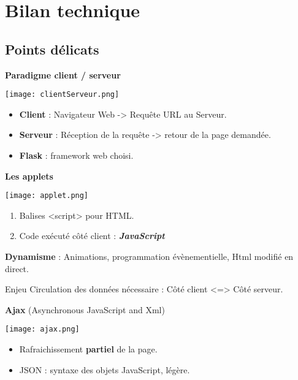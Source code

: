 	\section{Bilan technique}
		\subsection*{Points délicats}
		\begin{frame}
			\textbf{Paradigme client / serveur}\\
				\begin{center}\texttt{[image: clientServeur.png]}\end{center}
				\begin{itemize}
				\item \textbf{Client} : Navigateur Web -> Requête URL au Serveur.
				\item \textbf{Serveur} : Réception de la requête -> retour de la page demandée.
				\item \textbf{Flask} : framework web choisi.
				\end{itemize}
		\end{frame}
		
		\begin{frame}
			\textbf{Les applets}\\
				\begin{center}\texttt{[image: applet.png]}\end{center}
				\begin{enumerate}
				\item Balises <script> pour HTML.
				\item Code exécuté côté client : \textbf{\textit{JavaScript}}
				\end{enumerate}
				
				\textbf{Dynamisme} : Animations, programmation évènementielle, Html modifié en direct.
				
				\begin{block}{Enjeu}
				Circulation des données nécessaire : Côté client <=> Côté serveur.
				\end{block}
		\end{frame}
		
		\begin{frame}
			\textbf{Ajax} (Asynchronous JavaScript and Xml)\\
				\begin{center}\texttt{[image: ajax.png]}\end{center}
				
				\begin{itemize}
				\item Rafraichissement \textbf{partiel} de la page.\\ %
				\item JSON : syntaxe des objets JavaScript, légère.
				\end{itemize}
		\end{frame}
		
